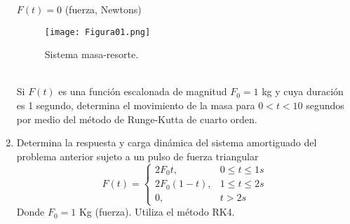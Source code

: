 \documentclass[letterpaper]{article}
\begin{document}
\begin{enumerate}
$F(t) = 0$ (fuerza, Newtons)
\begin{figure}[!h]
	\centering
	\texttt{[image: Figura01.png]}  
	\label{fig:figura01}
	\caption{Sistema masa-resorte.}
\end{figure}
\\Si $F(t)$ es una función escalonada de magnitud $F_{0}=1$ kg y cuya duración es 1 segundo, determina el movimiento de la masa para $0<t<10$ segundos por medio del método de Runge-Kutta de cuarto orden.
\item Determina la respuesta y carga dinámica del sistema amortiguado del problema anterior sujeto a un pulso de fuerza triangular
\begin{equation*}
F(t) =
	\begin{cases}
2F_{0}t,  & 0 \leq t \leq 1 s\\
2F_{0}(1-t), & 1 \leq t \leq 2 s\\
0, & t>2 s
\end{cases}
\end{equation*}
Donde $F_{0}=1$ Kg (fuerza). Utiliza el método RK4.
\end{enumerate}
\end{document}
